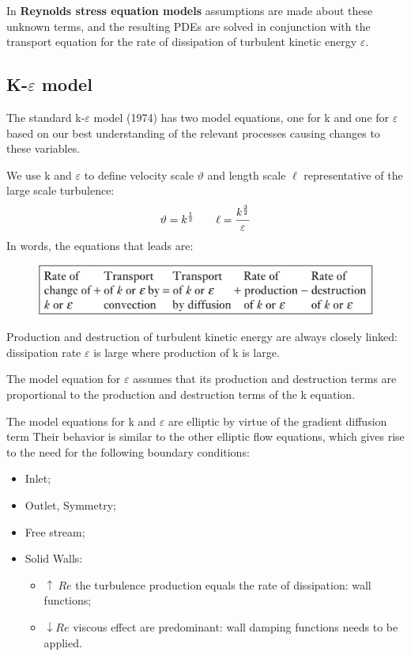 \documentclass[a4paper, 15pt]{article}
\begin{document}
In
\textbf{Reynolds stress equation models} assumptions are made about these unknown terms, and the resulting
PDEs are solved in conjunction with the transport equation for the rate of dissipation of
turbulent kinetic energy $\varepsilon$. 

\newpage
\subsection{K-$\varepsilon$ model}

The
standard k-$\varepsilon$ model (1974) has two model equations, one for k and
one for $\varepsilon$ based on our best understanding of the relevant processes causing changes to these
variables. 

We
use k and $\varepsilon$ to define velocity scale $\vartheta$ and length scale $\ell$ representative of the large scale
turbulence:
\[\vartheta = k^{1\over2} \qquad \ell = \dfrac{k^{3\over2}}{\varepsilon}\]
In
words, the equations that leads are:
\begin{figure}[H]
	\centering
	\includegraphics[width=0.5\linewidth]{fig/screenshot003}
	\label{fig:screenshot003}
\end{figure}

Production
and destruction of turbulent kinetic energy are always closely linked: dissipation rate
$\varepsilon$ is large where production of k is large. 

The
model equation for $\varepsilon$ assumes that its production and destruction terms are proportional to
the production and destruction terms of the k equation. \newline 

The
model equations for k and $\varepsilon$ are elliptic by virtue of the gradient diffusion term Their
behavior is similar to the other elliptic flow equations, which gives rise to the need for the
following boundary conditions:
\begin{itemize}
	\item Inlet;
	\item Outlet, Symmetry;
	\item Free stream;
	\item Solid Walls:
	\begin{itemize}
		\item $\uparrow~Re$ the turbulence production equals the rate of dissipation: wall functions;
		\item $\downarrow Re$ viscous effect are predominant: wall damping functions needs to be applied. 
	\end{itemize}
\end{itemize}
\end{document}
